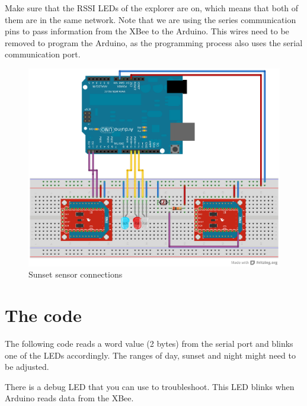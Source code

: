 Make sure that the RSSI LEDs of the explorer are on, which means that both of them are in the same network.
Note that we are using the series communication pins to pass information from the XBee to the Arduino.
This wires need to be removed to program the Arduino, as the programming process also uses the serial communication port.

\begin{figure}[htbp]
  \centering
  \includegraphics[width=0.9\linewidth]{figures/sunset_detector_fixedFINAL.eps}
  \caption{Sunset sensor connections}
  \label{fig:sunset_sensor}
\end{figure}

\section{The code}

The following code reads a word value (2 bytes) from the serial port and blinks one of the LEDs accordingly.
The ranges of day, sunset and night might need to be adjusted. 

There is a debug LED that you can use to troubleshoot.
This LED blinks when Arduino reads data from the XBee.


